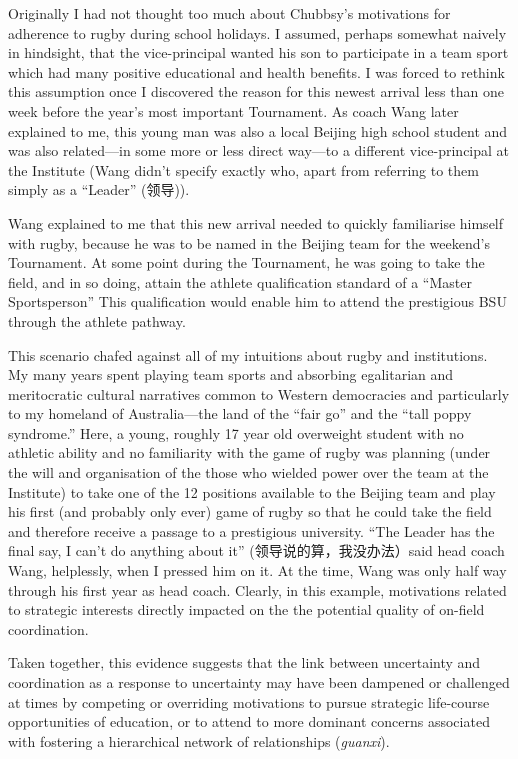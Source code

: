 \begin{CJK}{UTF8}{gbsn}
Originally I had not thought too much about Chubbsy's motivations for adherence to rugby during school holidays.  I assumed, perhaps somewhat naively in hindsight, that the vice-principal wanted his son to participate in a team sport which had many positive educational and health benefits.  I was forced to rethink this assumption once I discovered the reason for this newest arrival less than one week before the year's most important Tournament.  As coach Wang later explained to me, this young man was also a local Beijing high school student and was also related---in some more or less direct way---to a different vice-principal at the Institute (Wang didn't specify exactly who, apart from referring to them simply as a ``Leader'' (领导)).

Wang explained to me that this new arrival needed to quickly familiarise himself with rugby, because he was to be named in the Beijing team for the weekend's Tournament.  At some point during the Tournament, he was going to take the field, and in so doing, attain the athlete qualification standard of a ``Master Sportsperson''  This qualification would enable him to attend the prestigious BSU through the athlete pathway.

This scenario chafed against all of my intuitions about rugby and institutions.  My many years spent playing team sports and absorbing egalitarian and meritocratic cultural narratives common to Western democracies and particularly to my homeland of Australia---the land of the ``fair go'' and the ``tall poppy syndrome.''  Here, a young, roughly 17 year old overweight student with no athletic ability and no familiarity with the game of rugby was planning (under the will and organisation of the those who wielded power over the team at the Institute) to take one of the 12 positions available to the Beijing team and play his first (and probably only ever) game of rugby so that he could take the field and therefore receive a passage to a prestigious university.  ``The Leader has the final say, I can't do anything about it'' (领导说的算，我没办法）said head coach Wang, helplessly, when I pressed him on it.  At the time, Wang was only half way through his first year as head coach.  Clearly, in this example, motivations related to strategic interests directly impacted on the the potential quality of on-field coordination.

Taken together, this evidence suggests that the link between uncertainty and coordination as a response to uncertainty may have been dampened or challenged at times by competing or overriding motivations to pursue strategic life-course opportunities of education, or to attend to more dominant concerns associated with fostering a hierarchical network of relationships (\textit{guanxi}).



\end{CJK}
